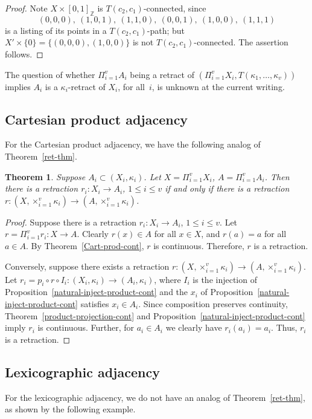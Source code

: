 \documentclass{article}
\theoremstyle{plain}
\newtheorem{thm}{Theorem}
\theoremstyle{definition}
\numberwithin{thm}{section}
\def\Z{{\mathbb Z}}
\begin{document}
\begin{proof} Note
$X \times [0,1]_{\Z}$ is
$T(c_2,c_1)$-connected, since
\[(0,0,0),~(1,0,1),~(1,1,0),~(0,0,1),~(1,0,0),~(1,1,1)
\]
is a listing of its points in a
$T(c_2,c_1)$-path; but
$X' \times \{0\}= \{(0,0,0), (1,0,0)\}$ is not
$T(c_2,c_1)$-connected. The assertion follows.
\end{proof}

The question of whether
$\Pi_{i=1}^v A_i$ being a retract of 
$(\Pi_{i=1}^v X_i, T(\kappa_1, \ldots, \kappa_v))$ implies $A_i$ is a
$\kappa_i$-retract of $X_i$, for all~$i$,
is unknown at the current writing.

\subsection{Cartesian product adjacency}
For the Cartesian product adjacency, we have the following analog of Theorem~\ref{ret-thm}.

\begin{thm}
Suppose $A_i \subset (X_i,\kappa_i)$. 
Let $X=\Pi_{i=1}^v X_i$,
$A=\Pi_{i=1}^v A_i$.
Then there is a retraction $r_i: X_i \to A_i$, $1 \le i \le v$
if and only if there is a retraction
$r: (X, \times_{i=1}^v \kappa_i) \to
(A, \times_{i=1}^v \kappa_i)$.
\end{thm}

\begin{proof}
Suppose there is a retraction $r_i: X_i \to A_i$, $1 \le i \le v$. Let $r = \Pi_{i=1}^v r_i: X \to A$.
Clearly $r(x) \in A$ for all $x \in X$, and $r(a)=a$ for all $a \in A$.
By Theorem~\ref{Cart-prod-cont},
$r$ is continuous.
Therefore, $r$ is a retraction.

Conversely, suppose there exists a retraction
$r: (X, \times_{i=1}^v \kappa_i) \to (A, \times_{i=1}^v \kappa_i)$.
Let $r_i = p_i \circ r \circ I_i:
(X_i,\kappa_i) \to (A_i,\kappa_i)$, where $I_i$ is
the injection of Proposition~\ref{natural-inject-product-cont} and the $x_i$ of 
Proposition~\ref{natural-inject-product-cont} satisfies $x_i \in A_i$.
Since composition
preserves continuity, Theorem~\ref{product-projection-cont} and
Proposition~\ref{natural-inject-product-cont}
imply $r_i$ is continuous. Further, for $a_i \in A_i$ we clearly have
$r_i(a_i)=a_i$. Thus, $r_i$ is a retraction.
\end{proof}


\subsection{Lexicographic adjacency}
For the lexicographic adjacency, we do not have an
analog of Theorem~\ref{ret-thm},
as shown by the following example.
\end{document}
